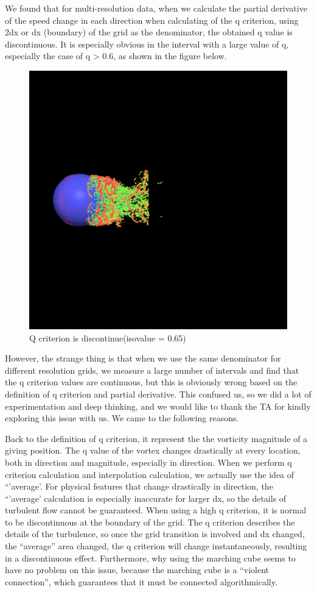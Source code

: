 \documentclass[acmtog]{acmart}
\begin{document}
We found that for multi-resolution data, when we calculate the partial derivative of the speed change in each direction when calculating of the q criterion, using 2dx or dx (boundary) of the grid as the denominator, the obtained q value is discontinuous. It is especially obvious in the interval with a large value of q, especially the case of q > 0.6, as shown in the figure below.
\begin{figure}[h]
	\centering
	\includegraphics[width = 0.68\linewidth]{images/q-criterion.png}
	\caption{Q criterion is discontinue(isovalue = 0.65)}
\end{figure}


However, the strange thing is that when we use the same denominator for different resolution grids, we measure a large number of intervals and find that the q criterion values are continuous, but this is obviously wrong based on the definition of q criterion and partial derivative. This confused us, so we did a lot of experimentation and deep thinking, and we would like to thank the TA for kindly exploring this issue with us. We came to the following reasons.


Back to the definition of q criterion, it represent the the vorticity magnitude of a giving position. The q value of the vortex changes drastically at every location, both in direction and magnitude, especially in direction. When we perform q criterion calculation and interpolation calculation, we actually use the idea of ``'average'. For physical features that change drastically in direction, the ``'average' calculation is especially inaccurate for larger dx, so the details of turbulent flow cannot be guaranteed. When using a high q criterion, it is normal to be discontinuous at the boundary of the grid. The q criterion describes the details of the turbulence, so once the grid transition is involved and dx changed, the ``average'' area changed, the q criterion will change instantaneously, resulting in a discontinuous effect. Furthermore, why using the marching cube seems to have no problem on this issue, because the marching cube is a ``violent connection'', which guarantees that it must be connected algorithmically. 
\end{document}
